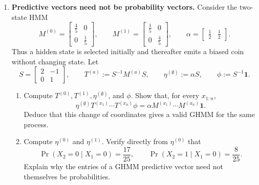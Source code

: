 \documentclass[11pt]{article}
\begin{document}
\begin{exercise}
\begin{enumerate}
\begin{enumerate}
        \item Derive the recursive update and identify its normalising
          factor:
          \[
            \eta^{(x_{1:n}a)}
              =\frac{\eta^{(x_{1:n})}T^{(a)}}
                {\eta^{(x_{1:n})}T^{(a)}\phi},
            \quad
            \Pr(X_{n+1}=a\mid X_{1:n}=x_{1:n})
              =\eta^{(x_{1:n})}T^{(a)}\phi.
          \]

        \item Conceptually contrast an HMM belief state with a GHMM
          predictive vector. Compare the meaning of their coordinates, their
          positivity and normalisation properties, and how they encode
          predictions of future observations.
      \end{enumerate}

    \item \textbf{Predictive vectors need not be probability vectors.}
      Consider the two-state HMM
      \[
        M^{(0)}=
          \begin{bmatrix}\tfrac45&0\\0&\tfrac15\end{bmatrix},
        \qquad
        M^{(1)}=
          \begin{bmatrix}\tfrac15&0\\0&\tfrac45\end{bmatrix},
        \qquad
        \alpha=\begin{bmatrix}\tfrac12&\tfrac12\end{bmatrix}.
      \]
      Thus a hidden state is selected initially and thereafter emits a biased
      coin without changing state. Let
      \[
        S=\begin{bmatrix}2&-1\\0&1\end{bmatrix},
        \qquad
        T^{(a)}:=S^{-1}M^{(a)}S,\qquad
        \eta^{(\emptyset)}:=\alpha S,\qquad
        \phi:=S^{-1}\mathbf 1.
      \]
      \begin{enumerate}
        \item Compute $T^{(0)},T^{(1)},\eta^{(\emptyset)}$, and $\phi$.
          Show that, for every $x_{1:n}$,
          \[
            \eta^{(\emptyset)}
              T^{(x_1)}\cdots T^{(x_n)}\phi
              =
            \alpha M^{(x_1)}\cdots M^{(x_n)}\mathbf 1.
          \]
          Deduce that this change of coordinates gives a valid GHMM for the
          same process.

        \item Compute $\eta^{(0)}$ and $\eta^{(1)}$. Verify directly from
          $\eta^{(0)}$ that
          \[
            \Pr(X_2=0\mid X_1=0)=\frac{17}{25},
            \qquad
            \Pr(X_2=1\mid X_1=0)=\frac8{25}.
          \]
          Explain why the entries of a GHMM predictive vector need not
          themselves be probabilities.
      \end{enumerate}


\end{enumerate}
\end{exercise}
\end{document}
